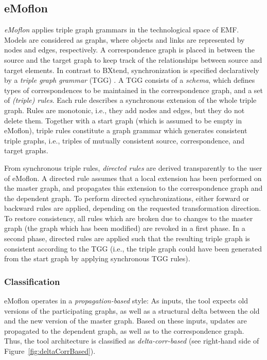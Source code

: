 \subsection{eMoflon}
\label{sec:eMoflon}


\emph{eMoflon} \cite{Leblebici2014a} applies triple graph grammars in the technological space of EMF. Models are considered as graphs, where objects and links are represented by nodes and edges, respectively. A correspondence graph is placed in between the source and the target graph to keep track of the relationships between source and target elements. In contrast to BXtend, synchronization is specified declaratively by a \emph{triple graph grammar} (TGG) \cite{Schurr1994}. A TGG consists of a \emph{schema}, which defines types of correspondences to be maintained in the correspondence graph, and a set of \emph{(triple) rules}. Each rule describes a synchronous extension of the whole triple graph. Rules are monotonic, i.e., they add nodes and edges, but they do not delete them. Together with a start graph (which is assumed to be empty in eMoflon), triple rules constitute a graph grammar which generates consistent triple graphs, i.e., triples of mutually consistent source, correspondence, and target graphs.

From synchronous triple rules, \emph{directed rules} are derived transparently to the user of eMoflon. A directed rule assumes that a local extension has been performed on the master graph, and propagates this extension to the correspondence graph and the dependent graph. To perform directed synchronizations, either forward or backward rules are applied, depending on the requested transformation direction. To restore consistency, all rules which are broken due to changes to the master graph (the graph which has been modified) are revoked in a first phase. In a second phase, directed rules are applied such that the resulting triple graph is consistent according to the TGG (i.e., the triple graph could have been generated from the start graph by applying synchronous TGG rules).   

\subsubsection{Classification}
\label{sec:ClassificationEMoflon}

eMoflon operates in a \emph{propagation-based} style: As inputs, the tool expects old versions of the participating graphs, as well as a structural delta between the old and the new version of the master graph. Based on these inputs, updates are propagated to the dependent graph, as well as to the correspondence graph. Thus, the tool architecture is classified as \emph{delta-corr-based} (see right-hand side of Figure~\ref{fig:deltaCorrBased}). 


